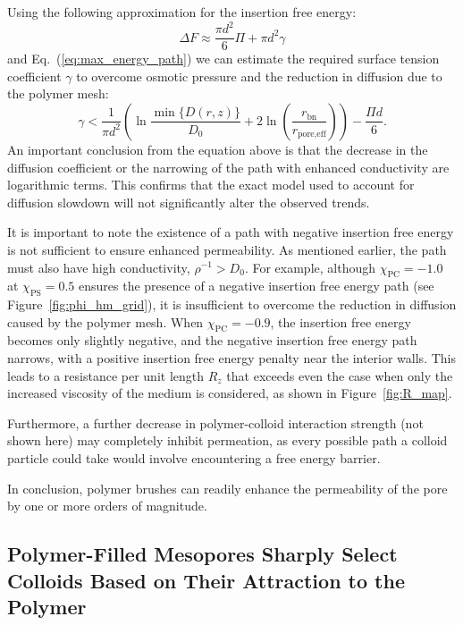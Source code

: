 \documentclass[12pt, a4paper]{article}
\begin{document}
Using the following approximation for the insertion free energy:
\begin{equation*}
    \Delta F \approx \frac{\pi d^2}{6} \Pi + \pi d^2 \gamma
\end{equation*}
and Eq.~({\ref{eq:max_energy_path}}) we can estimate the required surface tension coefficient $\gamma$ to overcome osmotic pressure and the reduction in diffusion due to the polymer mesh:
\begin{equation}
\gamma < \frac{1}{\pi d^2} \left( \ln\frac{\min\{D(r,z)\}}{D_0} + 2\ln\left( \frac{r_{\text{bn}}}{r_{\text{pore,eff}}} \right) \right) - \frac{\Pi d}{6}.
\end{equation}
An important conclusion from the equation above is that the decrease in the diffusion coefficient or the narrowing of the path with enhanced conductivity are logarithmic terms.
This confirms that the exact model used to account for diffusion slowdown will not significantly alter the observed trends.


It is important to note the existence of a path with negative insertion free energy is not sufficient to ensure enhanced permeability.
As mentioned earlier, the path must also have high conductivity, $\rho^{-1} > D_0$.
For example, although $\chi_{\text{PC}} = -1.0$ at $\chi_{\text{PS}} = 0.5$ ensures the presence of a negative insertion free energy path (see Figure~\ref{fig:phi_hm_grid}), it is insufficient to overcome the reduction in diffusion caused by the polymer mesh.
When $\chi_{\textrm{PC}} = -0.9$, the insertion free energy becomes only slightly negative, and the negative insertion free energy path narrows, with a positive insertion free energy penalty near the interior walls. 
This leads to a resistance per unit length $R_z$ that exceeds even the case when only the increased viscosity of the medium is considered, as shown in Figure~\ref{fig:R_map}.

Furthermore, a further decrease in polymer-colloid interaction strength (not shown here) may completely inhibit permeation, as every possible path a colloid particle could take would involve encountering a free energy barrier.

In conclusion, polymer brushes can readily enhance the permeability of the pore by one or more orders of magnitude.

\subsection{Polymer-Filled Mesopores Sharply Select Colloids Based on Their Attraction to the Polymer}
\end{document}
